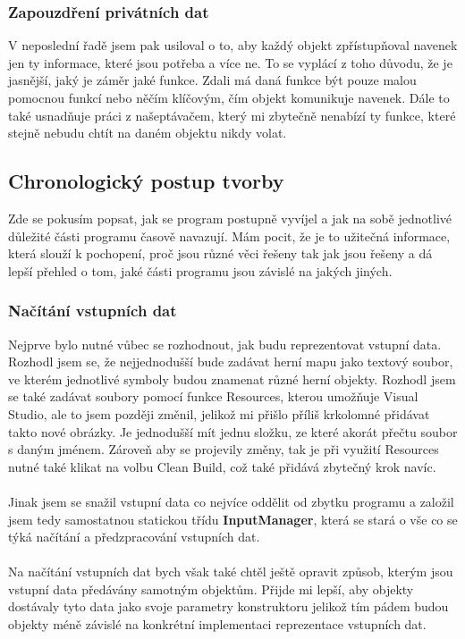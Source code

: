 \documentclass[a4]{article}
\begin{document}
\subsubsection{Zapouzdření privátních dat}
V neposlední řadě jsem pak usiloval o to, aby každý objekt zpřístupňoval navenek jen ty informace, které jsou potřeba a více ne. To se vyplácí z toho důvodu, že je jasnější, jaký je záměr jaké funkce. Zdali má daná funkce být pouze malou pomocnou funkcí nebo něčím klíčovým, čím objekt komunikuje navenek. Dále to také usnadňuje práci z našeptávačem, který mi zbytečně nenabízí ty funkce, které stejně nebudu chtít na daném objektu nikdy volat.
\subsection{Chronologický postup tvorby}
Zde se pokusím popsat, jak se program postupně vyvíjel a jak na sobě jednotlivé důležité části programu časově navazují. Mám pocit, že je to užitečná informace, která slouží k pochopení, proč jsou různé věci řešeny tak jak jsou řešeny a dá lepší přehled o tom, jaké části programu jsou závislé na jakých jiných.
\subsubsection{Načítání vstupních dat}
Nejprve bylo nutné vůbec se rozhodnout, jak budu reprezentovat vstupní data. Rozhodl jsem se, že nejjednodušší bude zadávat herní mapu jako textový soubor, ve kterém jednotlivé symboly budou znamenat různé herní objekty. Rozhodl jsem se také zadávat soubory pomocí funkce Resources, kterou umožňuje Visual Studio, ale to jsem později změnil, jelikož mi přišlo příliš krkolomné přidávat takto nové obrázky. Je jednodušší mít jednu složku, ze které akorát přečtu soubor s daným jménem. Zároveň aby se projevily změny, tak je při využití Resources nutné také klikat na volbu Clean Build, což také přidává zbytečný krok navíc. 
\\\\
Jinak jsem se snažil vstupní data co nejvíce oddělit od zbytku programu a založil jsem tedy samostatnou statickou třídu \textbf{InputManager}, která se stará o vše co se týká načítání a předzpracování vstupních dat.
\\\\
Na načítání vstupních dat bych však také chtěl ještě opravit způsob, kterým jsou vstupní data předávány samotným objektům. Přijde mi lepší, aby objekty dostávaly tyto data jako svoje parametry konstruktoru jelikož tím pádem budou objekty méně závislé na konkrétní implementaci reprezentace vstupních dat.
\end{document}
